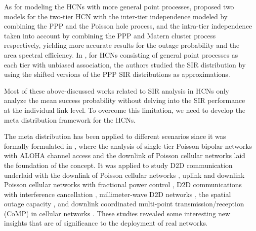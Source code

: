 \documentclass[12pt,draftclsnofoot,journal,onecolumn]{IEEEtran}
\begin{document}
As for modeling the HCNs with more general point processes, \cite{Deng15} proposed two models for the two-tier HCN with the inter-tier independence modeled by combining the PPP and the Poisson hole process, and the intra-tier independence taken into account by combining the PPP and Matern cluster process respectively, yielding more accurate results for the outage probability and the area spectral efficiency. In \cite{WeiASAPPP16}, for HCNs consisting of general point processes as each tier with unbiased association, the authors studied the SIR distribution by using the shifted versions of the PPP SIR distributions as approximations.

Most of these above-discussed works related to SIR analysis in HCNs only analyze the mean success probability without delving into the SIR performance at the individual link level. To overcome this limitation, we need to develop the meta distribution framework for the HCNs.  

The meta distribution has been applied to different scenarios since it was formally formulated in \cite{MHmeta}, where the analysis of single-tier Poisson bipolar networks with ALOHA channel access and the downlink of Poisson cellular networks laid the foundation of the concept. It was applied to study D2D communication underlaid with the downlink of Poisson cellular networks \cite{2017mHaenggiTcom}, uplink and downlink Poisson cellular networks with fractional power control \cite{YWmetaPower}, D2D communications with interference cancellation \cite{YWmetaIC}, millimeter-wave D2D networks \cite{Deng17}, the spatial outage capacity \cite{SOCmeta}, and downlink coordinated multi-point transmission/reception (CoMP) in cellular networks \cite{CuiCoMP17}. These studies revealed some interesting new insights that are of significance to the deployment of real networks.  
\end{document}
